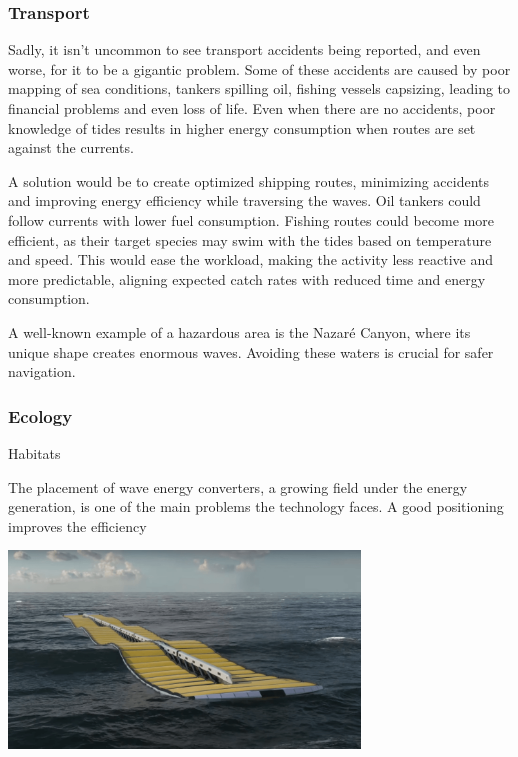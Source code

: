 \subsubsection{Transport}
Sadly, it isn't uncommon to see transport accidents being reported, and even worse, for it to be a gigantic problem.
Some of these accidents are caused by poor mapping of sea conditions, tankers spilling oil, fishing vessels capsizing, leading
to financial problems and even loss of life. Even when there are no accidents, poor knowledge of tides results in higher energy consumption when routes are set against the currents.

A solution would be to create optimized shipping routes, minimizing accidents and improving energy efficiency while 
traversing the waves. Oil tankers could follow currents with lower fuel consumption. Fishing routes could become more
efficient, as their target species may swim with the tides based on temperature and speed. This would ease the workload,
making the activity less reactive and more predictable, aligning expected catch rates with reduced time and energy 
consumption.

A well-known example of a hazardous area is the Nazaré Canyon, where its unique shape creates enormous waves. 
Avoiding these waters is crucial for safer navigation.

\subsubsection{Ecology}


Habitats 

The placement of wave energy converters, a growing field under the energy generation, is one of the main problems the
technology faces. A good positioning improves the efficiency
\begin{center}
    \includegraphics[width=0.7\textwidth]{images/chapter/introduction/renewable_energy.png}  %
    
    \label{fig:The Design of a Wave Energy Converter to Electricity}        
\end{center}

